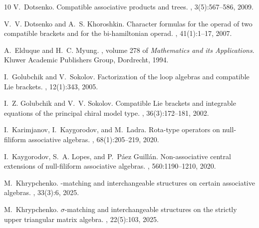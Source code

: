 \documentclass{jonasart}
\begin{document}
{\begin{thebibliography}{10}
            V.~Dotsenko.
            \newblock Compatible associative products and trees.
            , 3(5):567–586, 2009.
            
            V.~V. Dotsenko and A.~S. {K}horoshkin.
            \newblock Character formulas for the operad of two compatible brackets and for the bi-hamiltonian operad.
            , 41(1):1–17, 2007.
            
            A.~Elduque and H.~C. Myung.
            , volume 278 of {\em Mathematics and its Applications}.
            \newblock Kluwer Academic Publishers Group, Dordrecht, 1994.
            
            I.~Golubchik and V.~{S}okolov.
            \newblock Factorization of the {l}oop {a}lgebras and {c}ompatible {L}ie {b}rackets.
            , 12(1):343, 2005.
            
            I.~Z. Golubchik and V.~V. {S}okolov.
            \newblock Compatible {L}ie {b}rackets and {i}ntegrable {e}quations of the {p}rincipal {c}hiral {m}odel {t}ype.
            , 36(3):172–181, 2002.
            
            I.~Karimjanov, I.~Kaygorodov, and M.~Ladra.
            \newblock Rota-type operators on null-filiform associative algebras.
            , 68(1):205--219, 2020.
            
            I.~Kaygorodov, S.~A. {L}opes, and P.~{P}áez Guillán.
            \newblock Non-associative central extensions of null-filiform associative algebras.
            , 560:1190–1210, 2020.
            
            M.~Khrypchenko.
            \newblock {$\sigma$}-matching and interchangeable structures on certain associative algebras.
            , 33(3):6, 2025.
            
            M.~Khrypchenko.
            \newblock $\sigma$-matching and {i}nterchangeable {s}tructures on the {s}trictly {u}pper {t}riangular {m}atrix {a}lgebra.
            , 22(5):103, 2025.
            

\end{thebibliography}}
\end{document}
